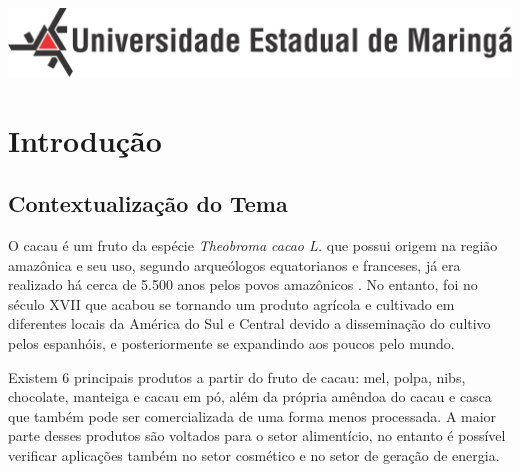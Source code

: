 \documentclass[
	12pt,				%
	openright,			%
	oneside,			%
	a4paper,			%
	english,			%
	french,				%
	spanish,			%
	brazil				%
	]{abntex2}
\begin{document}
\begin{minipage}[c][0cm][c]{0cm} %

\centering

\includegraphics[scale=0.45]{../../Pictures/uem-modelo-04.png}  
\end{minipage}


\frenchspacing 


\imprimircapa



 
 


\tableofcontents*
\cleardoublepage

\textual
\chapter{Introdução}

\section{Contextualização do Tema}

O cacau é um fruto da espécie \textit{Theobroma cacao L.} que possui origem na região amazônica e seu uso, segundo arqueólogos equatorianos e franceses, já era realizado há cerca de 5.500 anos pelos povos amazônicos \cite{2}. No entanto, foi no século XVII que acabou se tornando um produto agrícola e cultivado em diferentes locais da América do Sul e Central devido a disseminação do cultivo pelos espanhóis, e posteriormente se expandindo aos poucos pelo mundo. \cite{1} 

Existem 6 principais produtos a partir do fruto de cacau: mel, polpa, nibs, chocolate, manteiga e cacau em pó, além da própria amêndoa do cacau e casca que também pode ser comercializada de uma forma menos processada. A maior parte desses produtos são voltados para o setor alimentício, no entanto é possível verificar aplicações também no setor cosmético e no setor de geração de energia. \cite{5}
\end{document}
